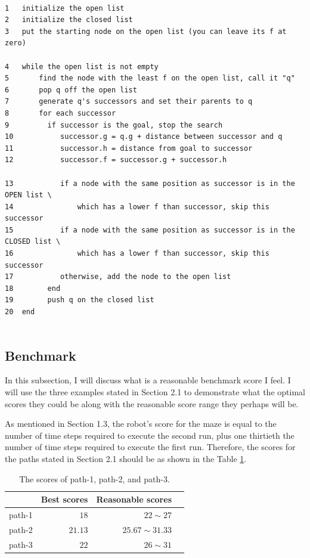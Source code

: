 \documentclass[11pt, oneside]{article}   	%
\begin{document}
\begin{verbatim}

1   initialize the open list
2   initialize the closed list
3   put the starting node on the open list (you can leave its f at zero)

4   while the open list is not empty
5       find the node with the least f on the open list, call it "q"
6       pop q off the open list
7       generate q's successors and set their parents to q
8       for each successor
9         if successor is the goal, stop the search
10           successor.g = q.g + distance between successor and q
11           successor.h = distance from goal to successor
12           successor.f = successor.g + successor.h

13           if a node with the same position as successor is in the OPEN list \
14               which has a lower f than successor, skip this successor
15           if a node with the same position as successor is in the CLOSED list \ 
16               which has a lower f than successor, skip this successor
17           otherwise, add the node to the open list
18        end
19        push q on the closed list
20  end


\end{verbatim}







\subsection{Benchmark}
In this subsection, I will discuss what is a reasonable benchmark score I feel. I will use the three examples stated in Section 2.1 to demonstrate what the optimal scores they could be along with the reasonable score range they perhaps will be.

As mentioned in Section 1.3, the robot's score for the maze is equal to the number of time steps required to execute the second run, plus one thirtieth the number of time steps required to execute the first run. Therefore, the scores for the paths stated in Section 2.1 should be as shown in the Table \ref{Benchmark}.

\begin{table}[htp]
\caption{The scores of path-1, path-2, and path-3.}
\begin{center}
\begin{tabular}{ rrrr } 
\hline
 & Best scores & Reasonable scores \\
\hline
path-1 & $18$    & $22 \sim 27$ \\ 
path-2 & $21.13$ & $25.67 \sim 31.33$ \\ 
path-3 & $22$    & $26 \sim 31$ \\ 
\hline
\end{tabular}
\end{center}
\label{Benchmark}
\end{table}%
\end{document}
